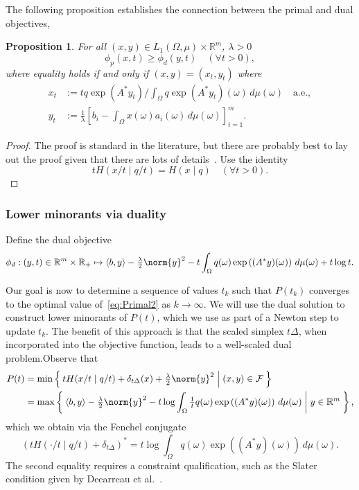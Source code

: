 \documentclass[10pt,a4paper]{article}
\numberwithin{equation}{section}
\newtheorem{proposition}[theorem]{Proposition}
\theoremstyle{definition}
\def\rr{{\mathbb R}}
\def\cF{{\cal F}}
\newcommand{\ip}[1]{\langle#1\rangle}
\begin{document}
The following proposition establishes the connection between the primal and dual objectives, 
\begin{proposition}\label{prop:strong-duality-attainment}
  For all $(x,y)\in L_1(\Omega,\mu)\times\rr^m$, $\lambda>0$
  \begin{equation}
    \phi_p(x,t) \ge \phi_d(y,t) \quad (\forall t>0),
  \end{equation}
  where equality holds if and only if $(x,y)=(x_t,y_t)$  where
  \begin{align}\label{eq:primal-dual-maps}
    x_t &:= tq\exp(A^*y_t)/\int_\Omega q\exp(A^*y_t)(\omega)\,d\mu(\omega)\quad\text{a.e.},\\
    y_t &:= \frac1\lambda
    \left[
      b_i - \int_\Omega x(\omega)a_i(\omega)\,d\mu(\omega)
    \right]_{i=1}^m.
  \end{align}
\end{proposition}
\begin{proof}
The proof is standard in the literature, but there are probably best to lay out the proof given that there are lots of details~\cite{ben-tal_RoleDualityOptimization_1988, decarreau_DualMethodsEntropy_1992}. Use the identity
\[
  tH(x/t\mid q/t) = H(x\mid q) \quad (\forall t>0).
\]
\end{proof}

\subsubsection{Lower minorants via duality}

Define the dual objective
\begin{equation}\label{eq:dual-value}
    \phi_d:(y,t)\in\rr^m\times\rr_+\mapsto {\ip{b,y} - \tfrac{\lambda}{2}\norm{y}^2 - t\int_\Omega q(\omega)\exp\left((A^*y)(\omega)\right) \,d\mu(\omega) + t\log t}.
\end{equation}

Our goal is now to determine a sequence of values $t_k$ such that $P(t_k)$ converges to the optimal value of~\eqref{eq:Primal2} as $k\to\infty$. We will use the dual solution to construct lower minorants of $P(t)$, which we use as part of a Newton step to update $t_k$.  The benefit of this approach is that the scaled simplex $t\Delta$, when incorporated into the objective function, leads to a well-scaled dual problem.Observe that
\begin{align*}
 P(t) &= \min\Set{tH(x/t\mid q/t) + \delta_{t\Delta}(x)+ \tfrac{\lambda}{2}\norm{y}^2 | (x, y) \in \cF}\\
      &= \max\Set{\ip{b,y} - \tfrac{\lambda}{2}\norm{y}^2 - t\log\int_\Omega \tfrac1t q(\omega)\exp\left((A^*y)(\omega)\right) \,d\mu(\omega) | y\in\rr^m},
\end{align*}
which we obtain via the Fenchel conjugate
\[
    (tH(\cdot/t\mid q/t) + \delta_{t\Delta})^* = t\log\int_\Omega q(\omega)\exp\left((A^*y)(\omega)\right) \,d\mu(\omega).
\]
The second equality requires a constraint qualification, such as the Slater condition given by Decarreau et al.~\cite[Lemma~2.6]{decarreau_DualMethodsEntropy_1992}.
\end{document}
